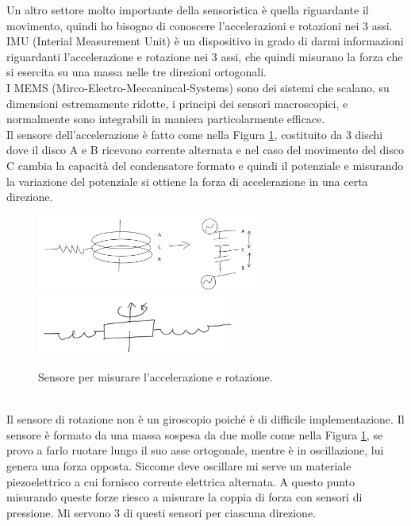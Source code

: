 \documentclass[11pt, twocolumn]{article}
\begin{document}
Un altro settore molto importante della sensoristica è quella riguardante il movimento, quindi ho bisogno di conoscere l'accelerazioni e rotazioni nei 3 assi.
IMU (Interial Measurement Unit) è un dispositivo in grado di darmi informazioni riguardanti l'accelerazione e rotazione nei 3 assi, che quindi misurano la forza che si esercita su una massa nelle tre direzioni ortogonali.\\
I MEMS (Mirco-Electro-Meccanincal-Systems) sono dei sistemi che scalano, su dimensioni estremamente ridotte, i principi dei sensori macroscopici, e normalmente sono integrabili in maniera particolarmente efficace.\\
Il sensore dell'accelerazione è fatto come nella Figura \ref{fig:accel}, costituito da 3 dischi dove il disco A e B ricevono corrente alternata e nel caso del movimento del disco C cambia la capacità del condensatore formato e quindi il potenziale e misurando la variazione del potenziale si ottiene la forza di accelerazione in una certa direzione. 
\begin{figure}[!h]
  \centering
  \includegraphics[width=\linewidth,height=2.5cm]{imgs/accelaration.png}
  \includegraphics[width=\linewidth,height=2cm]{imgs/rotation.png}
  \caption{Sensore per misurare l'accelerazione e rotazione.}
  \label{fig:accel}
\end{figure}\\
Il sensore di rotazione non è un giroscopio poiché è di difficile implementazione.
Il sensore è formato da una massa sospesa da due molle come nella Figura \ref{fig:accel}, se provo a farlo ruotare lungo il suo asse ortogonale, mentre è in oscillazione, lui genera una forza opposta.
Siccome deve oscillare mi serve un materiale piezoelettrico a cui fornisco corrente elettrica alternata.
A questo punto misurando queste forze riesco a misurare la coppia di forza con sensori di pressione. Mi servono 3 di questi sensori per ciascuna direzione.
\end{document}
